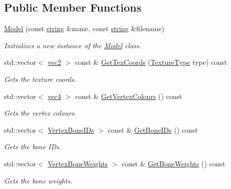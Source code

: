 \subsection*{Public Member Functions}
\begin{DoxyCompactItemize}
\item 
\hyperlink{class_model_ae74bb9abcef7456bb360317cd1dda70c}{Model} (const \hyperlink{_types_8h_ad453f9f71ce1f9153fb748d6bb25e454}{string} \&name, const \hyperlink{_types_8h_ad453f9f71ce1f9153fb748d6bb25e454}{string} \&filename)
\begin{DoxyCompactList}\small\item\em Initializes a new instance of the \hyperlink{class_model}{Model} class. \end{DoxyCompactList}\item 
std\+::vector$<$ \hyperlink{_types_8h_a43182e59794291f6ab00e51b160706c2}{vec2} $>$ const \& \hyperlink{class_model_ac09d49884daedc470b791727ee4af9e5}{Get\+Tex\+Coords} (\hyperlink{_material_8h_a65468556d79304b3a4bfc464cc12e549}{Texture\+Type} type) const 
\begin{DoxyCompactList}\small\item\em Gets the texture coords. \end{DoxyCompactList}\item 
std\+::vector$<$ \hyperlink{_types_8h_ac54e849f8b2339f592307eaf6cdbba77}{vec4} $>$ const \& \hyperlink{class_model_a002dc69d9e1482659a7bd573bc9eb59b}{Get\+Vertex\+Colours} () const 
\begin{DoxyCompactList}\small\item\em Gets the vertex colours. \end{DoxyCompactList}\item 
std\+::vector$<$ \hyperlink{struct_vertex_bone_i_ds}{Vertex\+Bone\+I\+Ds} $>$ const \& \hyperlink{class_model_aad48f547c3fd951378df3552d1b324e0}{Get\+Bone\+I\+Ds} () const 
\begin{DoxyCompactList}\small\item\em Gets the bone I\+Ds. \end{DoxyCompactList}\item 
std\+::vector$<$ \hyperlink{struct_vertex_bone_weights}{Vertex\+Bone\+Weights} $>$ const \& \hyperlink{class_model_a06a6597ce660c174d9cd30858341a8cd}{Get\+Bone\+Weights} () const 
\begin{DoxyCompactList}\small\item\em Gets the bone weights. \end{DoxyCompactList}\item 

\end{DoxyCompactItemize}
